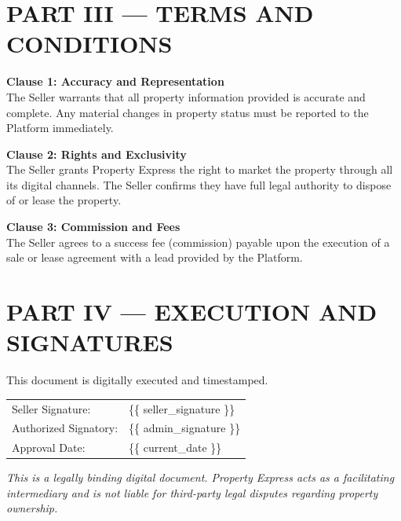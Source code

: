 \documentclass[12pt]{article}
\begin{document}
\vspace{1.5em}

\section*{PART III — TERMS AND CONDITIONS}

\textbf{Clause 1: Accuracy and Representation} \\
The Seller warrants that all property information provided is accurate and complete. Any material changes in property status must be reported to the Platform immediately.

\vspace{0.5em}

\textbf{Clause 2: Rights and Exclusivity} \\
The Seller grants Property Express the right to market the property through all its digital channels. The Seller confirms they have full legal authority to dispose of or lease the property.

\vspace{0.5em}

\textbf{Clause 3: Commission and Fees} \\
The Seller agrees to a success fee (commission) payable upon the execution of a sale or lease agreement with a lead provided by the Platform.

\section*{PART IV — EXECUTION AND SIGNATURES}
This document is digitally executed and timestamped.

\vspace{2em}

\begin{tabular}{ll}
Seller Signature: & \{\{ seller\_signature \}\} \\
Authorized Signatory: & \{\{ admin\_signature \}\} \\
Approval Date: & \{\{ current\_date \}\} \\
\end{tabular}

\vspace{2em}

\noindent \textit{This is a legally binding digital document. Property Express acts as a facilitating intermediary and is not liable for third-party legal disputes regarding property ownership.}
\end{document}
